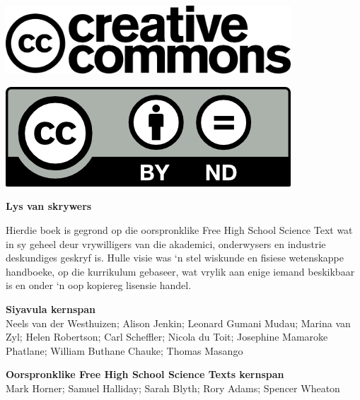 \vspace*{4in}

\begin{center}
\begin{minipage}{0.6\textwidth}
\includegraphics[width=0.8\textwidth]{title_images/cc2.png}
\end{minipage}
\begin{minipage}{0.3\textwidth}
\includegraphics[width=0.8\textwidth]{title_images/cc1.png}
\end{minipage}
\end{center}

\newpage
\thispagestyle{empty}


\begin{flushleft} \textbf{\LARGE  Lys van skrywers} \end{flushleft}

{Hierdie boek is gegrond op die oorspronklike Free High School Science Text wat in sy geheel deur vrywilligers van die akademici, onderwysers en industrie deskundiges geskryf is. Hulle visie was ‘n stel wiskunde en fisiese wetenskappe handboeke, op die kurrikulum gebaseer, wat vrylik aan enige iemand beskikbaar is en onder ‘n oop kopiereg lisensie handel.} \par

\textbf{\large Siyavula kernspan} \\

Neels van der Westhuizen; Alison Jenkin; Leonard Gumani Mudau; Marina van Zyl; Helen Robertson; Carl Scheffler; Nicola du Toit; Josephine Mamaroke Phatlane; William Buthane Chauke; Thomas Masango \par

\textbf{\large Oorspronklike Free High School Science Texts kernspan}\\

Mark Horner; Samuel Halliday; Sarah Blyth; Rory Adams; Spencer Wheaton \par 


